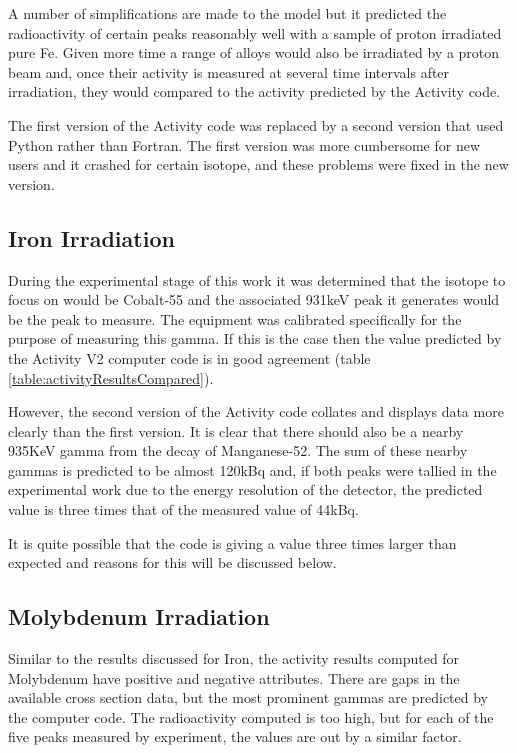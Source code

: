 A number of simplifications are made to the model but it predicted the radioactivity of certain peaks reasonably well with a sample of proton irradiated pure Fe.  Given more time a range of alloys would also be irradiated by a proton beam and, once their activity is measured at several time intervals after irradiation, they would compared to the activity predicted by the Activity code.

The first version of the Activity code was replaced by a second version that used Python rather than Fortran.  The first version was more cumbersome for new users and it crashed for certain isotope, and these problems were fixed in the new version.



\subsection{Iron Irradiation}

During the experimental stage of this work it was determined that the isotope to focus on would be Cobalt-55 and the associated 931keV peak it generates would be the peak to measure.  The equipment was calibrated specifically for the purpose of measuring this gamma.  If this is the case then the value predicted by the Activity V2 computer code is in good agreement (table \ref{table:activityResultsCompared}). 

However, the second version of the Activity code collates and displays data more clearly than the first version.  It is clear that there should also be a nearby 935KeV gamma from the decay of Manganese-52.  The sum of these nearby gammas is predicted to be almost 120kBq and, if both peaks were tallied in the experimental work due to the energy resolution of the detector, the predicted value is three times that of the measured value of 44kBq.

It is quite possible that the code is giving a value three times larger than expected and reasons for this will be discussed below.


\subsection{Molybdenum Irradiation}

Similar to the results discussed for Iron, the activity results computed for Molybdenum have positive and negative attributes.  There are gaps in the available cross section data, but the most prominent gammas are predicted by the computer code.  The radioactivity computed is too high, but for each of the five peaks measured by experiment, the values are out by a similar factor.



